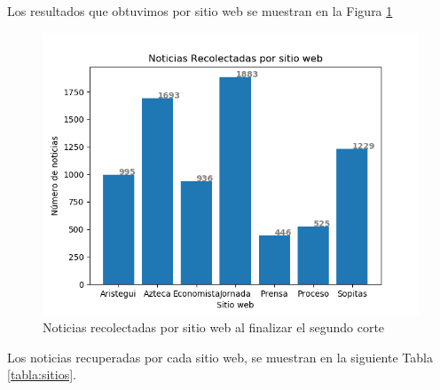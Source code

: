 Los resultados que obtuvimos por sitio web se muestran en la Figura \ref{Fig:notPorSit} 

\begin{figure}[H]
	\centering
	\includegraphics[scale=.6]{imagenes/Capitulo5/noticiasPorSitio.png}
	\caption{Noticias recolectadas por sitio web al finalizar el segundo corte}
	\label{Fig:notPorSit}
\end{figure}


Los noticias recuperadas por cada sitio web, se muestran en la siguiente Tabla \ref{tabla:sitios}.

